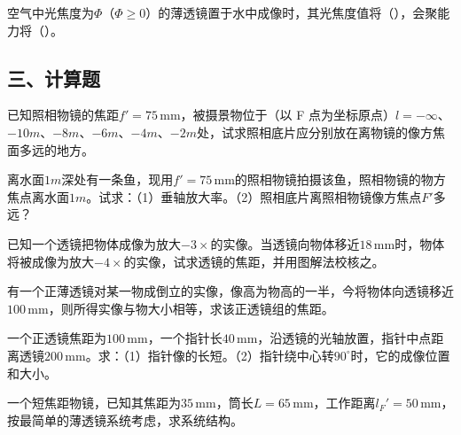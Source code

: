 \documentclass[padl, analysis, notocnum]{ExBook}
\newcommand{\answerarea}[1][3.5cm]{%
  \par\vspace{1mm}%
  \noindent{\color{themeColor!35}\rule{\linewidth}{0.4pt}}\par
  \noindent\begin{minipage}[t][#1][t]{\linewidth}\vspace{0pt}\end{minipage}\par
  \noindent{\color{themeColor!35}\rule{\linewidth}{0.4pt}}\par
}
\begin{document}
\begin{qitems}[startnum=7]
\qitem 空气中光焦度为$\Phi$（$\Phi \geq 0$）的薄透镜置于水中成像时，其光焦度值将（\hspace{1.6em}），会聚能力将（\hspace{1.6em}）。
\label{q:37:start}
\answerarea[4.0cm]
\label{q:37:end}
\end{qitems}

\subsection{三、计算题}
\begin{qitems}[startnum=1]
\qitem 已知照相物镜的焦距$f'=75\,\mathrm{mm}$，被摄景物位于（以 F 点为坐标原点）$l=-\infty$、$-10m$、$-8m$、$-6m$、$-4m$、$-2m$处，试求照相底片应分别放在离物镜的像方焦面多远的地方。
\label{q:38:start}
\answerarea[7.0cm]
\label{q:38:end}
\end{qitems}

\begin{qitems}[startnum=2]
\qitem 离水面$1m$深处有一条鱼，现用$f'=75\,\mathrm{mm}$的照相物镜拍摄该鱼，照相物镜的物方焦点离水面$1m$。试求：（1）垂轴放大率。（2）照相底片离照相物镜像方焦点$F'$多远？
\label{q:39:start}
\answerarea[7.0cm]
\label{q:39:end}
\end{qitems}

\begin{qitems}[startnum=3]
\qitem 已知一个透镜把物体成像为放大$-3\times$的实像。当透镜向物体移近$18\,\mathrm{mm}$时，物体将被成像为放大$-4\times$的实像，试求透镜的焦距，并用图解法校核之。
\label{q:40:start}
\answerarea[7.0cm]
\label{q:40:end}
\end{qitems}

\begin{qitems}[startnum=4]
\qitem 有一个正薄透镜对某一物成倒立的实像，像高为物高的一半，今将物体向透镜移近$100\,\mathrm{mm}$，则所得实像与物大小相等，求该正透镜组的焦距。
\label{q:41:start}
\answerarea[7.0cm]
\label{q:41:end}
\end{qitems}

\begin{qitems}[startnum=5]
\qitem 一个正透镜焦距为$100\,\mathrm{mm}$，一个指针长$40\,\mathrm{mm}$，沿透镜的光轴放置，指针中点距离透镜$200\,\mathrm{mm}$。求：（1）指针像的长短。（2）指针绕中心转$90^{\circ}$时，它的成像位置和大小。
\label{q:42:start}
\answerarea[7.0cm]
\label{q:42:end}
\end{qitems}

\begin{qitems}[startnum=6]
\qitem 一个短焦距物镜，已知其焦距为$35\,\mathrm{mm}$，筒长$L=65\,\mathrm{mm}$，工作距离$l_{F}'=50\,\mathrm{mm}$，按最简单的薄透镜系统考虑，求系统结构。
\label{q:43:start}
\answerarea[7.0cm]
\label{q:43:end}
\end{qitems}
\end{document}

